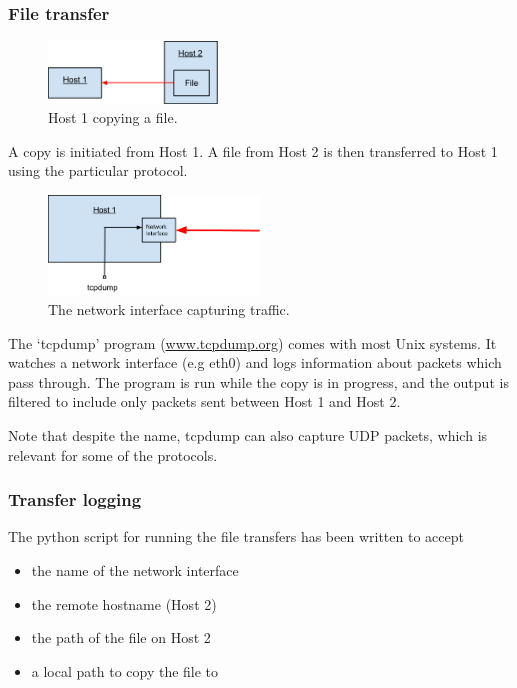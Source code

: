 \documentclass{sig-alternate-05-2015}
\begin{document}
\subsubsection{File transfer}
\begin{figure}[H]
	\label{fig:copy_example}
	\centering
	\includegraphics[width=0.4\textwidth]{img/basic_transfer_example.png}
	\caption{Host 1 copying a file.}
\end{figure}
A copy is initiated from Host 1. A file from Host 2 is then transferred to Host 1 using the particular protocol.
\begin{figure}[H]
	\label{fig:interface_example}
	\centering
	\includegraphics[width=0.5\textwidth]{img/if_example.png}
	\caption{The network interface capturing traffic.}
\end{figure}
The `tcpdump' program (\url{www.tcpdump.org}) comes with most Unix systems. It watches a network interface (e.g eth0) and logs information about packets which pass through. The program is run while the copy is in progress, and the output is filtered to include only packets sent between Host 1 and Host 2.

Note that despite the name, tcpdump can also capture UDP packets, which is relevant for some of the protocols.

\subsubsection{Transfer logging}
The python script for running the file transfers has been written to accept
\begin{itemize}
	\item the name of the network interface
	\item the remote hostname (Host 2)
	\item the path of the file on Host 2
	\item a local path to copy the file to
\end{itemize}
\end{document}
